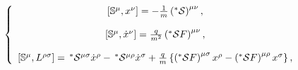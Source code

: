 \begin{equation}
\left\{ 
\begin{array}{c}
\left[ \Bbb{S}^{\mu },x^{\nu }\right] =-\frac{1}{m}\left( ^{*}\mathcal{S}%
\right) ^{\mu \nu }, \\ 
\\ 
\left[ \Bbb{S}^{\mu },\dot{x}^{\nu }\right] =\frac{q}{m^{2}}\left( ^{*}%
\mathcal{S}F\right) ^{\mu \nu }, \\ 
\\ 
\left[ \Bbb{S}^{\mu },L^{\rho \sigma }\right] =\,^{*}\mathcal{S}^{\mu \sigma
}\dot{x}^{\rho }-\,^{*}\mathcal{S}^{\mu \rho }\dot{x}^{\sigma }+\frac{q}{m}%
\left\{ \left( ^{*}\mathcal{S}F\right) ^{\mu \sigma }x^{\rho }-\left( ^{*}%
\mathcal{S}F\right) ^{\mu \rho }x^{\sigma }\right\} ,
\end{array}
\right.
\end{equation}


